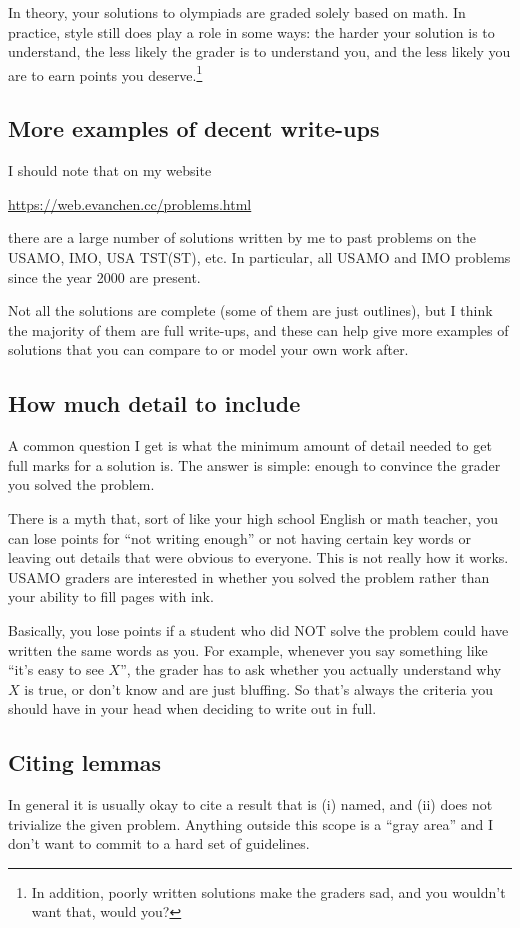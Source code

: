 \documentclass[11pt]{scrartcl}
\begin{document}
In theory, your solutions to olympiads are graded solely based on math.
In practice, style still does play a role in some ways:
the harder your solution is to understand,
the less likely the grader is to understand you,
and the less likely you are to earn points you deserve.\footnote{In addition,
  poorly written solutions make the graders sad, and you wouldn't want that, would you?}

\subsection{More examples of decent write-ups}
I should note that on my website
\begin{center}
  \url{https://web.evanchen.cc/problems.html}
\end{center}
there are a large number of solutions written by me
to past problems on the USAMO, IMO, USA TST(ST), etc.
In particular, all USAMO and IMO problems since the year 2000
are present.

Not all the solutions are complete (some of them are just outlines),
but I think the majority of them are full write-ups,
and these can help give more examples of solutions
that you can compare to or model your own work after.

\subsection{How much detail to include}
A common question I get is what the minimum amount of detail needed
to get full marks for a solution is.
The answer is simple: enough to convince the grader you solved the problem.

There is a myth that, sort of like your high school English or math teacher,
you can lose points for ``not writing enough'' or not having certain key words
or leaving out details that were obvious to everyone.
This is not really how it works.
USAMO graders are interested in whether you solved the problem
rather than your ability to fill pages with ink.

Basically, \alert{you lose points if a student who did NOT solve the problem
could have written the same words as you}.
For example, whenever you say something like ``it's easy to see $X$'',
the grader has to ask whether you actually understand why $X$ is true,
or don't know and are just bluffing.
So that's always the criteria you should have in your head
when deciding to write out in full.

\subsection{Citing lemmas}
In general it is usually okay to cite a result that is
(i) named, and (ii) does not trivialize the given problem.
Anything outside this scope is a ``gray area''
and I don't want to commit to a hard set of guidelines.
\end{document}
